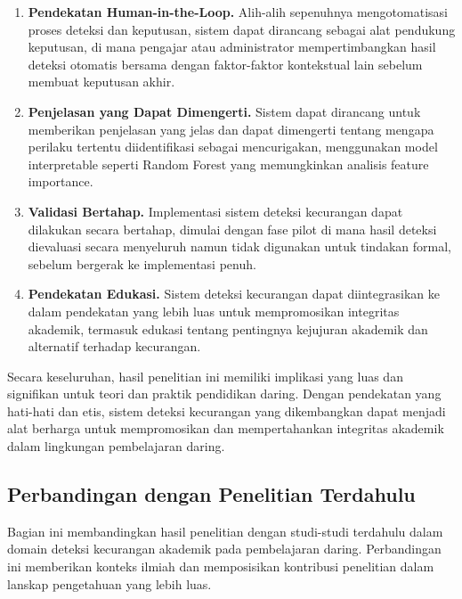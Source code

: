 \begin{enumerate}
    \item \textbf{Pendekatan Human-in-the-Loop.} Alih-alih sepenuhnya mengotomatisasi proses deteksi dan keputusan, sistem dapat dirancang sebagai alat pendukung keputusan, di mana pengajar atau administrator mempertimbangkan hasil deteksi otomatis bersama dengan faktor-faktor kontekstual lain sebelum membuat keputusan akhir.

    \item \textbf{Penjelasan yang Dapat Dimengerti.} Sistem dapat dirancang untuk memberikan penjelasan yang jelas dan dapat dimengerti tentang mengapa perilaku tertentu diidentifikasi sebagai mencurigakan, menggunakan model interpretable seperti Random Forest yang memungkinkan analisis feature importance.

    \item \textbf{Validasi Bertahap.} Implementasi sistem deteksi kecurangan dapat dilakukan secara bertahap, dimulai dengan fase pilot di mana hasil deteksi dievaluasi secara menyeluruh namun tidak digunakan untuk tindakan formal, sebelum bergerak ke implementasi penuh.

    \item \textbf{Pendekatan Edukasi.} Sistem deteksi kecurangan dapat diintegrasikan ke dalam pendekatan yang lebih luas untuk mempromosikan integritas akademik, termasuk edukasi tentang pentingnya kejujuran akademik dan alternatif terhadap kecurangan.
\end{enumerate}

Secara keseluruhan, hasil penelitian ini memiliki implikasi yang luas dan signifikan untuk teori dan praktik pendidikan daring. Dengan pendekatan yang hati-hati dan etis, sistem deteksi kecurangan yang dikembangkan dapat menjadi alat berharga untuk mempromosikan dan mempertahankan integritas akademik dalam lingkungan pembelajaran daring.

\subsection{Perbandingan dengan Penelitian Terdahulu}
\label{subsec:perbandinganPenelitianTerdahulu}

Bagian ini membandingkan hasil penelitian dengan studi-studi terdahulu dalam domain deteksi kecurangan akademik pada pembelajaran daring. Perbandingan ini memberikan konteks ilmiah dan memposisikan kontribusi penelitian dalam lanskap pengetahuan yang lebih luas.

